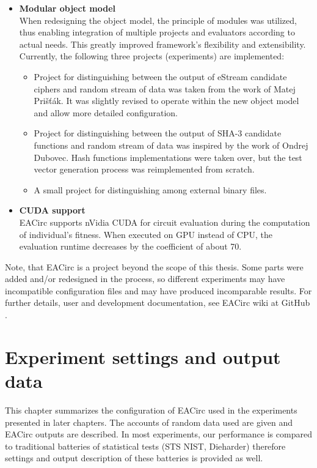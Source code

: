 \documentclass[12pt,oneside]{fithesis2}		%
\renewcommand{\_}{\leavevmode \kern0.0em\vbox{\hrule width0.4em}}
\newcommand{\squarebullet}{\textcolor{black}{\raisebox{0.15em}{\rule{4pt}{4pt}}}}
\newenvironment{myItemize}{
  \begin{itemize}[leftmargin=2em,rightmargin=1em,itemsep=\parskip ,parsep=0em,topsep=0em,partopsep=0em]
  \renewcommand{\labelitemi}{\squarebullet}
  \renewcommand{\labelitemii}{$\diamond$}
}{
  \end{itemize}
}
\begin{document}
\begin{myItemize}
\item \textbf{Modular object model}\\
When redesigning the object model, the principle of modules was utilized, thus enabling integration of multiple projects 
and evaluators according to actual needs. This greatly improved framework's flexibility and extensibility.
Currently, the following three projects (experiments) are implemented:
\begin{myItemize}
\item Project for distinguishing between the output of eStream candidate ciphers and random stream of data was taken from the work of 
Matej Prišťák.
It was slightly revised to operate within the new object model and allow more detailed configuration.
\item Project for distinguishing between the output of SHA-3 candidate functions and random stream of data was inspired by the work of 
Ondrej Dubovec.
Hash functions implementations were taken over, but the test vector generation process was reimplemented from scratch. 
\item A small project for distinguishing among external binary files.
\end{myItemize}
\item \textbf{CUDA support}\\
EACirc supports nVidia CUDA for circuit evaluation during the computation of individual's fitness.
When executed on GPU instead of CPU, the evaluation runtime decreases by the coefficient of about 70.
\end{myItemize}

\noindent
Note, that EACirc is a project beyond the scope of this thesis. Some parts were added and/or redesigned in the process, so
different experiments may have incompatible configuration files and may have produced incomparable results.
For further details, user and development documentation, see EACirc wiki at GitHub \parencite{eacirc-github}.	

\chapter{Experiment settings and output data}
\label{chap:settings}

This chapter summarizes the configuration of EACirc used in the experiments presented in later chapters.
The accounts of random data used are given and EACirc outputs are described. 
In most experiments, our performance is compared to traditional batteries of statistical tests (STS NIST, Dieharder)
therefore settings and output description of these batteries is provided as well.
\end{document}
